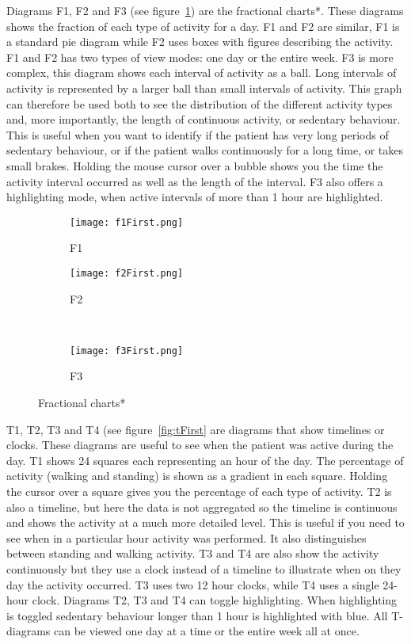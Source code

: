 Diagrams F1, F2 and F3 (see figure~\ref{fig:fFirst}) are the fractional charts*. These diagrams shows the fraction of each type of activity for a day. F1 and F2 are similar, F1 is a standard pie diagram while F2 uses boxes with figures describing the activity. F1 and F2 has two types of view modes: one day or the entire week. F3 is more complex, this diagram shows each interval of activity as a ball. Long intervals of activity is represented by a larger ball than small intervals of activity. This graph can therefore be used both to see the distribution of the different activity types and, more importantly, the length of continuous activity, or sedentary behaviour. This is useful when you want to identify if the patient has very long periods of sedentary behaviour, or if the patient walks continuously for a long time, or takes small brakes. Holding the mouse cursor over a bubble shows you the time the activity interval occurred as well as the length of the interval. F3 also offers a highlighting mode, when active intervals of more than 1 hour are highlighted.

\begin{figure}[h!]
  \centering
  \begin{subfigure}[b]{0.45\textwidth}
    \centering
    \texttt{[image: f1First.png]}
    \caption{F1}
  \end{subfigure}
  \begin{subfigure}[b]{0.45\textwidth}
    \centering
    \texttt{[image: f2First.png]}
    \caption{F2}
  \end{subfigure}
  \\
  \begin{subfigure}[b]{0.45\textwidth}
    \centering
    \texttt{[image: f3First.png]}
    \caption{F3}
  \end{subfigure}
  \caption{Fractional charts*}
  \label{fig:fFirst}
\end{figure}

T1, T2, T3 and T4 (see figure~\ref{fig:tFirst} are diagrams that show timelines or clocks. These diagrams are useful to see when the patient was active during the day. T1 shows 24 squares each representing an hour of the day. The percentage of activity (walking and standing) is shown as a gradient in each square. Holding the cursor over a square gives you the percentage of each type of activity. T2 is also a timeline, but here the data is not aggregated so the timeline is continuous and shows the activity at a much more detailed level. This is useful if you need to see when in a particular hour activity was performed. It also distinguishes between standing and walking activity. T3 and T4 are also show the activity continuously but they use a clock instead of a timeline to illustrate when on they day the activity occurred. T3 uses two 12 hour clocks, while T4 uses a single 24-hour clock. Diagrams T2, T3 and T4 can toggle highlighting. When highlighting is toggled sedentary behaviour longer than 1 hour is highlighted with blue. All T-diagrams can be viewed one day at a time or the entire week all at once. 

